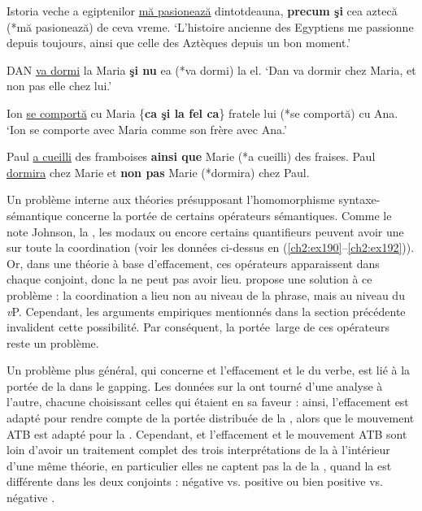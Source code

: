 \ea \label{ch2:ex239}
\ea Istoria veche a egiptenilor \uline{mă pasionează} dintotdeauna, \textbf{precum şi} cea aztecă (*mă pasionează) de ceva vreme. \label{ch2:ex239a}
\glt ‘L’histoire ancienne des Egyptiens me passionne depuis toujours, ainsi que celle des Aztèques depuis un bon moment.’  

\ex DAN \uline{va dormi} la Maria \textbf{şi nu} ea (*va dormi) la el. \label{ch2:ex239b}
\glt ‘Dan va dormir chez Maria, et non pas elle chez lui.’

\ex Ion \uline{se comportă} cu Maria \{\textbf{ca şi {\textbar} la fel ca}\} fratele lui (*se comportă) cu Ana. \label{ch2:ex239c}
\glt ‘Ion se comporte avec Maria comme son frère avec Ana.’
\z
\z


\ea \label{ch2:ex240}
\ea Paul \uline{a cueilli} des framboises \textbf{ainsi que} Marie (*a cueilli) des fraises. \label{ch2:ex240a}  
\ex Paul \uline{dormira} chez Marie et \textbf{non pas} Marie (*dormira) chez Paul. \label{ch2:ex240b}  
\z
\z

Un problème interne aux théories présupposant l’homomorphisme syntaxe-sémantique concerne la portée de certains opérateurs sémantiques. Comme le note Johnson, la , les modaux ou encore certains quantifieurs peuvent avoir une  sur toute la coordination (voir les données ci-dessus en (\ref{ch2:ex190}--\ref{ch2:ex192})). Or, dans une théorie à base d’effacement, ces opérateurs apparaissent dans chaque conjoint, donc la  ne peut pas avoir lieu. \citet{Coppock2001} propose une solution à ce problème : la coordination a lieu non au niveau de la phrase, mais au niveau du \textit{v}P. Cependant, les arguments empiriques mentionnés dans la section précédente invalident cette possibilité. Par conséquent, la portée~large de ces opérateurs reste un problème.

Un problème plus général, qui concerne et l’effacement et le  du verbe, est lié à la portée de la  dans le gapping. Les données sur la  ont tourné d’une analyse à l’autre, chacune choisissant celles qui étaient en sa faveur : ainsi, l’effacement est adapté pour rendre compte de la portée distribuée de la , alors que le mouvement ATB est adapté pour la . Cependant, et l’effacement et le mouvement ATB sont loin d’avoir un traitement complet des trois interprétations de la  à l’intérieur d’une même théorie, en particulier elles ne captent pas la  de la , quand la  est différente dans les deux conjoints : négative vs. positive ou bien positive vs. négative \citep{Repp2009}.

